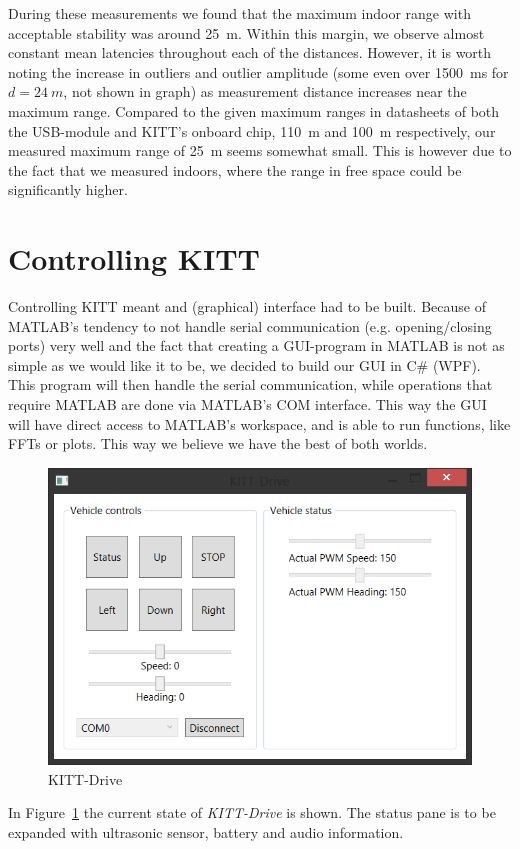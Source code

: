 \documentclass[11pt,titlepage]{report}
\begin{document}
During these measurements we found that the maximum indoor range with acceptable stability was around \SI{25}{m}. Within this margin, we observe almost constant mean latencies throughout each of the distances. However, it is worth noting the increase in outliers and outlier amplitude (some even over \SI{1500}{ms} for $d = \SI{24}{m}$, not shown in graph) as measurement distance increases near the maximum range. Compared to the given maximum ranges in datasheets of both the USB-module and KITT's onboard chip, \SI{110}{m} and \SI{100}{m} respectively, our measured maximum range of \SI{25}{m} seems somewhat small. This is however due to the fact that we measured indoors, where the range in free space could be significantly higher. \cite{lm506-datasheet,rn41-datasheet}

\section{Controlling KITT}
Controlling KITT meant and (graphical) interface had to be built. Because of MATLAB's tendency to not handle serial communication (e.g. opening/closing ports) very well and the fact that creating a GUI-program in MATLAB is not as simple as we would like it to be, we decided to build our GUI in C\# (WPF). This program will then handle the serial communication, while operations that require MATLAB are done via MATLAB's COM interface. This way the GUI will have direct access to MATLAB's workspace, and is able to run functions, like FFTs or plots. This way we believe we have the best of both worlds.

\begin{figure}[H]
	\centering
	\includegraphics[width=0.8\linewidth]{resource/KITT-Drive.png}
	\caption{KITT-Drive}
	\label{fig:ass1-kitt-drive}
\end{figure}

In Figure~\ref{fig:ass1-kitt-drive} the current state of \textit{KITT-Drive} is shown. The status pane is to be expanded with ultrasonic sensor, battery and audio information.
\end{document}
